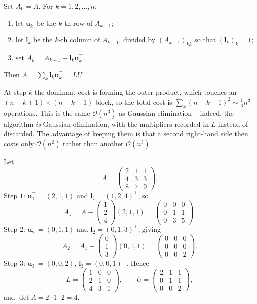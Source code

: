 \documentclass[a4paper]{scrartcl}
\begin{document}
\begin{method}
  Set $A_0 = A$. For $k = 1, 2, \dots, n$:
  \begin{enumerate}[label=(\roman*)]
    \item let $\mathbf{u}_k^\top$ be the $k$-th row of $A_{k-1}$;
    \item let $\mathbf{l}_k$ be the $k$-th column of $A_{k-1}$, divided by $(A_{k-1})_{kk}$ so that $(\mathbf{l}_k)_k = 1$;
    \item set $A_k = A_{k-1} - \mathbf{l}_k\mathbf{u}_k^\top$.
  \end{enumerate}
  Then $A = \sum_k \mathbf{l}_k\mathbf{u}_k^\top = LU$.
\end{method}

At step $k$ the dominant cost is forming the outer product, which touches an $(n-k+1)\times(n-k+1)$ block, so the total cost is $\sum_k (n-k+1)^2 \sim \tfrac13 n^3$ operations. This is the same $\mathcal{O}(n^3)$ as Gaussian elimination -- indeed, the algorithm \emph{is} Gaussian elimination, with the multipliers recorded in $L$ instead of discarded. The advantage of keeping them is that a second right-hand side then costs only $\mathcal{O}(n^2)$ rather than another $\mathcal{O}(n^3)$.

\begin{example}
  Let
  $$
  A = \begin{pmatrix} 2 & 1 & 1\\ 4 & 3 & 3\\ 8 & 7 & 9\end{pmatrix}.
  $$
  Step $1$: $\mathbf{u}_1^\top = (2,1,1)$ and $\mathbf{l}_1 = (1,2,4)^\top$, so
  $$
  A_1 = A - \begin{pmatrix}1\\2\\4\end{pmatrix}(2,1,1) = \begin{pmatrix}0&0&0\\0&1&1\\0&3&5\end{pmatrix}.
  $$
  Step $2$: $\mathbf{u}_2^\top = (0,1,1)$ and $\mathbf{l}_2 = (0,1,3)^\top$, giving
  $$
  A_2 = A_1 - \begin{pmatrix}0\\1\\3\end{pmatrix}(0,1,1) = \begin{pmatrix}0&0&0\\0&0&0\\0&0&2\end{pmatrix}.
  $$
  Step $3$: $\mathbf{u}_3^\top = (0,0,2)$, $\mathbf{l}_3 = (0,0,1)^\top$. Hence
  $$
  L = \begin{pmatrix}1&0&0\\2&1&0\\4&3&1\end{pmatrix}, \qquad U = \begin{pmatrix}2&1&1\\0&1&1\\0&0&2\end{pmatrix},
  $$
  and $\det A = 2 \cdot 1\cdot 2 = 4$.
\end{example}
\end{document}
